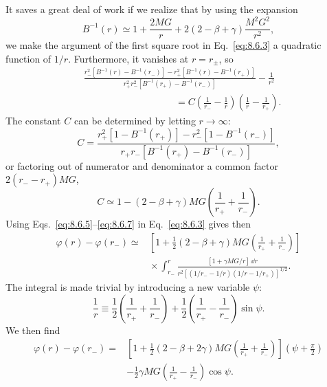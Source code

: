 It saves a great deal of work if we realize that by using the expansion
\[
  B^{-1}(r)
  \simeq
  1+\frac{2MG}{r}
  +2(2-\beta+\gamma)\frac{M^2G^2}{r^2},
\]
we make the argument of the first square root in
Eq.~\eqref{eq:8.6.3} a quadratic function of \(1/r\). Furthermore, it
vanishes at \(r=r_\pm\), so
\begin{equation}
  \begin{split}
  &\frac{
    r_-^2\!\left[B^{-1}(r)-B^{-1}(r_-)\right]
    -r_+^2\!\left[B^{-1}(r)-B^{-1}(r_+)\right]
  }{
    r_+^2r_-^2\!\left[B^{-1}(r_+)-B^{-1}(r_-)\right]
  }
  -\frac{1}{r^2}\\
  &\hspace{4cm}
  =C\left(\frac1{r_-}-\frac1r\right)
  \left(\frac1r-\frac1{r_+}\right).
  \end{split}
  \tag{8.6.6}\label{eq:8.6.6}
\end{equation}
The constant \(C\) can be determined by letting \(r\to\infty\):
\[
  C
  =
  \frac{
    r_+^2[1-B^{-1}(r_+)]
    -r_-^2[1-B^{-1}(r_-)]
  }{
    r_+r_-[B^{-1}(r_+)-B^{-1}(r_-)]
  },
\]
or factoring out of numerator and denominator a common factor
\(2(r_--r_+)MG\),
\begin{equation}
  C
  \simeq
  1-(2-\beta+\gamma)MG
  \left(\frac1{r_+}+\frac1{r_-}\right).
  \tag{8.6.7}\label{eq:8.6.7}
\end{equation}
Using Eqs.~\eqref{eq:8.6.5}--\eqref{eq:8.6.7} in
Eq.~\eqref{eq:8.6.3} gives then
\[
  \begin{split}
  \varphi(r)-\varphi(r_-)
  \simeq{}&
  \left[
    1+\frac12(2-\beta+\gamma)MG
    \left(\frac1{r_+}+\frac1{r_-}\right)
  \right]\\
  &{}\times
  \int_{r_-}^{r}
  \frac{[1+\gamma MG/r]\,\dd r}
  {r^2[(1/r_--1/r)(1/r-1/r_+)]^{1/2}}.
  \end{split}
\]
The integral is made trivial by introducing a new variable \(\psi\):
\begin{equation}
  \frac1r
  \equiv
  \frac12\left(\frac1{r_+}+\frac1{r_-}\right)
  +\frac12\left(\frac1{r_+}-\frac1{r_-}\right)\sin\psi.
  \tag{8.6.8}\label{eq:8.6.8}
\end{equation}
We then find
\begin{equation}
  \begin{split}
  \varphi(r)-\varphi(r_-)
  ={}&
  \left[
    1+\frac12(2-\beta+2\gamma)MG
    \left(\frac1{r_+}+\frac1{r_-}\right)
  \right]
  \left(\psi+\frac{\pi}{2}\right)\\
  &-\frac12\gamma MG
  \left(\frac1{r_+}-\frac1{r_-}\right)\cos\psi.
  \end{split}
  \tag{8.6.9}\label{eq:8.6.9}
\end{equation}
